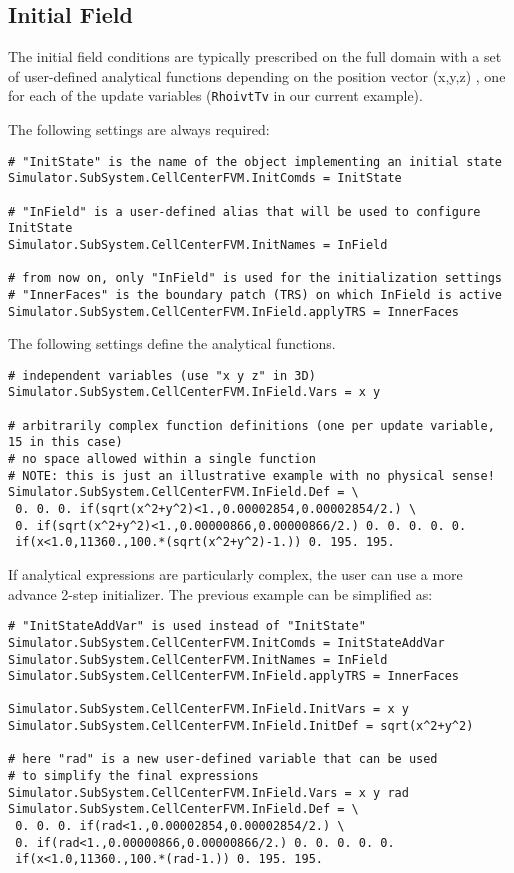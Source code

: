 \documentclass[11pt]{article}
\begin{document}
\subsection{Initial Field}

The initial field conditions are typically prescribed on the full domain with a set of 
user-defined analytical functions depending on the position vector (x,y,z) \cite{FParser}, 
one for each of the update variables ({\tt RhoivtTv} in our current example). 

The following settings are always required:
\begin{verbatim}
# "InitState" is the name of the object implementing an initial state 
Simulator.SubSystem.CellCenterFVM.InitComds = InitState

# "InField" is a user-defined alias that will be used to configure InitState
Simulator.SubSystem.CellCenterFVM.InitNames = InField

# from now on, only "InField" is used for the initialization settings
# "InnerFaces" is the boundary patch (TRS) on which InField is active
Simulator.SubSystem.CellCenterFVM.InField.applyTRS = InnerFaces
\end{verbatim}

The following settings define the analytical functions.
\begin{verbatim} 
# independent variables (use "x y z" in 3D)
Simulator.SubSystem.CellCenterFVM.InField.Vars = x y  

# arbitrarily complex function definitions (one per update variable, 15 in this case)
# no space allowed within a single function
# NOTE: this is just an illustrative example with no physical sense!
Simulator.SubSystem.CellCenterFVM.InField.Def = \
 0. 0. 0. if(sqrt(x^2+y^2)<1.,0.00002854,0.00002854/2.) \
 0. if(sqrt(x^2+y^2)<1.,0.00000866,0.00000866/2.) 0. 0. 0. 0. 0. 
 if(x<1.0,11360.,100.*(sqrt(x^2+y^2)-1.)) 0. 195. 195.
\end{verbatim}

If analytical expressions are particularly complex, the user can use a more advance
2-step initializer. The previous example can be simplified as:

\begin{verbatim}
# "InitStateAddVar" is used instead of "InitState"
Simulator.SubSystem.CellCenterFVM.InitComds = InitStateAddVar
Simulator.SubSystem.CellCenterFVM.InitNames = InField
Simulator.SubSystem.CellCenterFVM.InField.applyTRS = InnerFaces

Simulator.SubSystem.CellCenterFVM.InField.InitVars = x y
Simulator.SubSystem.CellCenterFVM.InField.InitDef = sqrt(x^2+y^2)

# here "rad" is a new user-defined variable that can be used 
# to simplify the final expressions 
Simulator.SubSystem.CellCenterFVM.InField.Vars = x y rad
Simulator.SubSystem.CellCenterFVM.InField.Def = \
 0. 0. 0. if(rad<1.,0.00002854,0.00002854/2.) \
 0. if(rad<1.,0.00000866,0.00000866/2.) 0. 0. 0. 0. 0. 
 if(x<1.0,11360.,100.*(rad-1.)) 0. 195. 195.
\end{verbatim}
\end{document}

